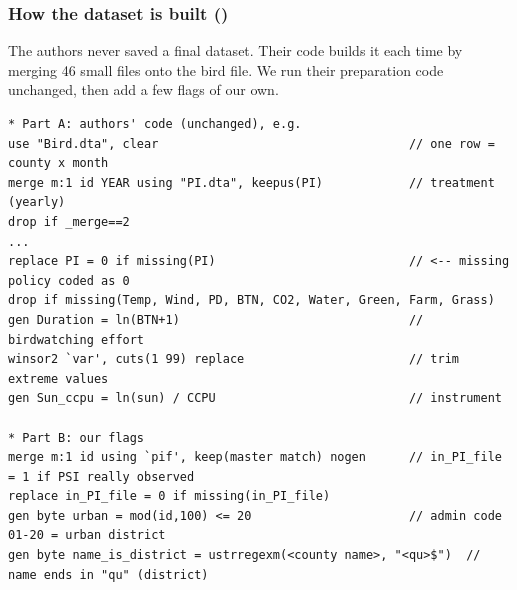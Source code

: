 \documentclass[11pt]{article}
\begin{document}
\subsubsection*{How the dataset is built ()}
The authors never saved a final dataset. Their code builds it each time by merging 46 small files onto the bird file. We run their preparation code unchanged, then add a few flags of our own.
\begin{lstlisting}
* Part A: authors' code (unchanged), e.g.
use "Bird.dta", clear                                   // one row = county x month
merge m:1 id YEAR using "PI.dta", keepus(PI)            // treatment (yearly)
drop if _merge==2
...
replace PI = 0 if missing(PI)                           // <-- missing policy coded as 0
drop if missing(Temp, Wind, PD, BTN, CO2, Water, Green, Farm, Grass)
gen Duration = ln(BTN+1)                                // birdwatching effort
winsor2 `var', cuts(1 99) replace                       // trim extreme values
gen Sun_ccpu = ln(sun) / CCPU                           // instrument

* Part B: our flags
merge m:1 id using `pif', keep(master match) nogen      // in_PI_file = 1 if PSI really observed
replace in_PI_file = 0 if missing(in_PI_file)
gen byte urban = mod(id,100) <= 20                      // admin code 01-20 = urban district
gen byte name_is_district = ustrregexm(<county name>, "<qu>$")  // name ends in "qu" (district)
\end{lstlisting}
\end{document}
